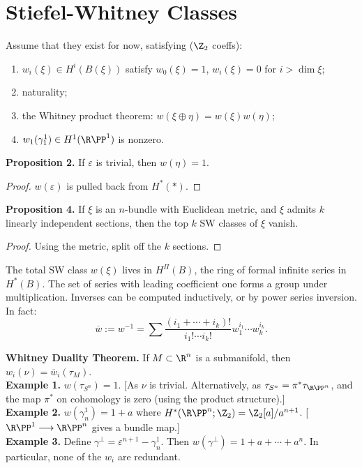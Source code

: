 \documentclass[11pt]{article}
\begin{document}
\section{Stiefel-Whitney Classes}
\begin{itemise}
\item Assume that they exist for now, satisfying ($\Z_2$ coeffs):
\begin{enumerate}\squishlist
\item $w_i(\xi)\in H^i(B(\xi))$ satisfy $w_0(\xi)=1$, $w_i(\xi)=0$ for $i>\dim\xi$;
\item naturality;
\item the Whitney product theorem: $w(\xi\oplus\eta)=w(\xi)w(\eta)$;
\item $w_1(\gamma_1^1)\in H^1(\RP^1)$ is nonzero.
\end{enumerate}
\item \textbf{Proposition 2.} If $\varepsilon$ is trivial, then $w(\eta)=1$. \begin{proof} $w(\varepsilon)$ is pulled back from $H^*(*)$.
\end{proof}
\item \textbf{Proposition 4.} If $\xi$ is an $n$-bundle with Euclidean metric, and $\xi$ admits $k$ linearly independent sections, then the top $k$ SW classes of $\xi$ vanish.
\begin{proof} Using the metric, split off the $k$ sections.
\end{proof}
\item The total SW class $w(\xi)$ lives in $H^\Pi(B)$, the ring of formal infinite series in $H^*(B)$. The set of series with leading coefficient one forms a group under multiplication. Inverses can be computed inductively, or by power series inversion. In fact: 
\[\overline w:=w^{-1}=\sum\frac{(i_1+\cdots +i_k)!}{i_1!\cdots i_k!}w_1^{i_1}\cdots w_k^{i_k}.\]
\item \textbf{Whitney Duality Theorem.} If $M\subset \R^n$ is a submanifold, then $w_i(\nu)=\overline w_i(\tau_M)$.\\
\textbf{Example 1.} $w(\tau_{S^n})=1$. [As $\nu$ is trivial. Alternatively, as $\tau_{S^n}=\pi^*\tau_{\RP^n}$, and the map $\pi^*$ on cohomology is zero (using the product structure).]\\
\textbf{Example 2.} $w(\gamma_n^1)=1+a$ where $H^*(\RP^n;\Z_2)=\Z_2[a]/a^{n+1}$. [$\RP^1\to\RP^n$ gives a bundle map.]\\
\textbf{Example 3.} Define $\gamma^\perp=\varepsilon^{n+1}-\gamma_n^1$. Then $w(\gamma^\perp)=1+a+\cdots+a^n$. In particular, none of the $w_i$ are redundant.\\

\end{itemise}
\end{document}
